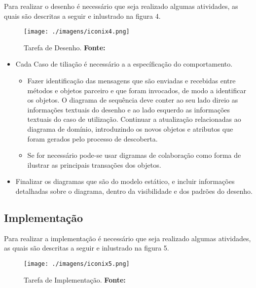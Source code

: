 \par Para realizar o desenho é necessário que seja
realizado algumas atividades, as quais são descritas a seguir e inlustrado na
figura 4.

\begin{figure}[h!]
  \centerline{\texttt{[image: ./imagens/iconix4.png]}}
  \caption[Tarefa de Desenho]
          {Tarefa de Desenho. \textbf{Fonte:}
          \cite{UML_Silva_Videira}}
\label{fig:exemplo1}
\end{figure}

\begin{itemize}
  \item Cada Caso de tiliação é necessário a a específicação do comportamento.
 	
 	\begin{itemize}
 	  \item  Fazer identificação das mensagens que são enviadas e recebidas entre
 	  métodos e objetos parceiro e que foram invocados, de modo a identificar os
 	  objetos. O diagrama de sequência deve conter ao seu lado direio as
 	  informações textuais do desenho e ao lado esquerdo as informações textuais
 	  do caso de utilização. Continuar a atualização relacionadas ao diagrama de domínio,
  	  introduzindo os novos objetos e atributos que foram gerados pelo processo
  	  de descoberta.
 	  \item Se for necessário pode-se usar digramas de colaboração como forma de
 	  ilustrar as principais transações dos objetos.
 	\end{itemize}
 	
 	\item Finalizar os diagramas que são do modelo estático, e incluir informações
 	detalhadas sobre o diagrama, dentro da visibilidade e dos padrões do desenho.
 	
\end{itemize} 


\subsection{Implementação}

\par Para realizar a implementação é necessário que seja
realizado algumas atividades, as quais são descritas a seguir e inlustrado na
figura 5.

\begin{figure}[h!]
  \centerline{\texttt{[image: ./imagens/iconix5.png]}}
  \caption[Tarefa de Implementação]
          {Tarefa de Implementação. \textbf{Fonte:}
          \cite{UML_Silva_Videira}}
\label{fig:exemplo1}
\end{figure}


